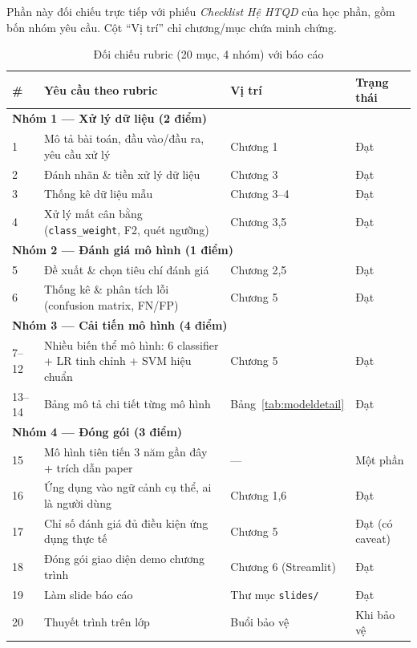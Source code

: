 \documentclass[12pt,a4paper,oneside]{report}
\renewcommand{\arraystretch}{1.18}
\newcommand{\code}[1]{\nolinkurl{#1}}
\begin{document}
Phần này đối chiếu trực tiếp với phiếu \emph{Checklist Hệ HTQD} của học phần,
gồm bốn nhóm yêu cầu. Cột ``Vị trí'' chỉ chương/mục chứa minh chứng.

\begin{table}[H]
\centering\small
\renewcommand{\arraystretch}{1.18}
\caption{Đối chiếu rubric (20 mục, 4 nhóm) với báo cáo}
\begin{tabularx}{\textwidth}{p{0.4cm}Xp{2.5cm}p{2.0cm}}
\toprule
\# & Yêu cầu theo rubric & Vị trí & Trạng thái\\
\midrule
\multicolumn{4}{l}{\textbf{Nhóm 1 --- Xử lý dữ liệu (2 điểm)}}\\
1 & Mô tả bài toán, đầu vào/đầu ra, yêu cầu xử lý & Chương 1 & Đạt\\
2 & Đánh nhãn \& tiền xử lý dữ liệu & Chương 3 & Đạt\\
3 & Thống kê dữ liệu mẫu & Chương 3--4 & Đạt\\
4 & Xử lý mất cân bằng (\code{class\_weight}, F2, quét ngưỡng) & Chương 3,5 & Đạt\\
\multicolumn{4}{l}{\textbf{Nhóm 2 --- Đánh giá mô hình (1 điểm)}}\\
5 & Đề xuất \& chọn tiêu chí đánh giá & Chương 2,5 & Đạt\\
6 & Thống kê \& phân tích lỗi (confusion matrix, FN/FP) & Chương 5 & Đạt\\
\multicolumn{4}{l}{\textbf{Nhóm 3 --- Cải tiến mô hình (4 điểm)}}\\
7--12 & Nhiều biến thể mô hình: 6 classifier + LR tinh chỉnh + SVM hiệu chuẩn & Chương 5 & Đạt\\
13--14 & Bảng mô tả chi tiết từng mô hình & Bảng~\ref{tab:modeldetail} & Đạt\\
\multicolumn{4}{l}{\textbf{Nhóm 4 --- Đóng gói (3 điểm)}}\\
15 & Mô hình tiên tiến 3 năm gần đây + trích dẫn paper & --- & Một phần\\
16 & Ứng dụng vào ngữ cảnh cụ thể, ai là người dùng & Chương 1,6 & Đạt\\
17 & Chỉ số đánh giá đủ điều kiện ứng dụng thực tế & Chương 5 & Đạt (có caveat)\\
18 & Đóng gói giao diện demo chương trình & Chương 6 (Streamlit) & Đạt\\
19 & Làm slide báo cáo & Thư mục \code{slides/} & Đạt\\
20 & Thuyết trình trên lớp & Buổi bảo vệ & Khi bảo vệ\\
\bottomrule
\end{tabularx}
\end{table}
\end{document}
